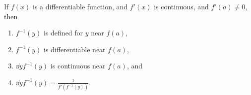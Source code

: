 \begin{mainTheorem}\label{theorem:IFT}
If $f(x)$ is a differentiable function, and $f'(x)$ is continuous, and
$f'(a) \neq 0$, then
\begin{enumerate}
\item $f^{-1}(y)$ is defined for $y$ near $f(a)$,
\item $f^{-1}(y)$ is differentiable near $f(a)$, 
\item $\dd{y} f^{-1}(y)$ is continuous near $f(a)$, and
\item $\dd{y} f^{-1}(y)  = \displaystyle\frac{1}{f'(f^{-1}(y))}$.
\end{enumerate}
\end{mainTheorem}




